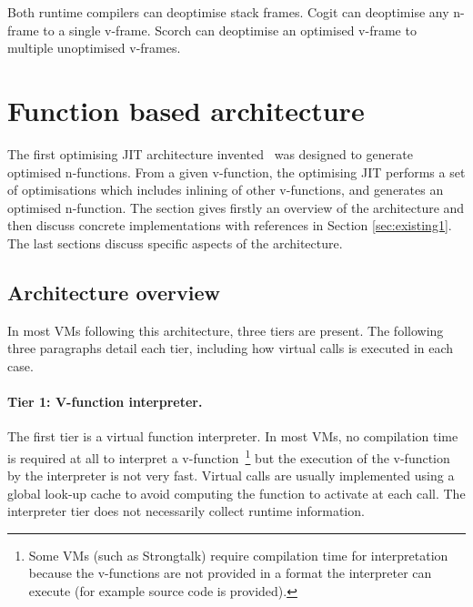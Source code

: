 \documentclass[a4paper,12pt,twoside]{../includes/ThesisStyle}
\begin{document}
Both runtime compilers can deoptimise stack frames. Cogit can deoptimise any n-frame to a single v-frame. Scorch can deoptimise an optimised v-frame to multiple unoptimised v-frames. 


\section{Function based architecture}
\label{sec:architecture}

The first optimising JIT architecture invented~\cite{UrsPHD} was designed to generate optimised n-functions. From a given v-function, the optimising JIT performs a set of optimisations which includes inlining of other v-functions, and generates an optimised n-function. The section gives firstly an overview of the architecture and then discuss concrete implementations with references in Section \ref{sec:existing1}. The last sections discuss specific aspects of the architecture.

\subsection{Architecture overview}

In most VMs following this architecture, three tiers are present. The following three paragraphs detail each tier, including how virtual calls is executed in each case.

\paragraph{Tier 1: V-function interpreter. } The first tier is a virtual function interpreter. In most VMs, no compilation time is required at all to interpret a v-function~\footnote{Some VMs (such as Strongtalk) require compilation time for interpretation because the v-functions are not provided in a format the interpreter can execute (for example source code is provided).} but the execution of the v-function by the interpreter is not very fast. Virtual calls are usually implemented using a global look-up cache to avoid computing the function to activate at each call. The interpreter tier does not necessarily collect runtime information. 
\end{document}
